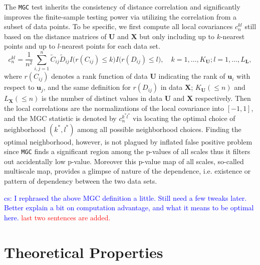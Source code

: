 \documentclass[11pt]{article}
\theoremstyle{definition}
\newcommand{\cs}[1]{\textcolor{blue}{cs: #1}}
\begin{document}
	The \texttt{MGC} test inherits the consistency of distance correlation and significantly improves the finite-sample testing power via utilizing the correlation from a subset of data points. To be specific, we first compute all local covariances $c^{kl}_{n}$ still based on the distance matrices of $\mathbf{U}$ and $\mathbf{X}$ but only including up to $k$-nearest points and up to $l$-nearest points for each data set. 
	\begin{equation}
	\label{eq:MGC}
	c^{kl}_{n} = \frac{1}{n^2} \sum\limits_{i,j=1}^{n} \tilde{C}_{ij} \tilde{D}_{ij} I\big( r(C_{ij}) \leq k \big) I\big(  r(D_{ij}) \leq l  \big), \quad k= 1, \ldots, K_{\mathbf{U}}; l =1, \ldots, L_{\mathbf{L}},
	\end{equation}
	where %
	$r(C_{ij})$ denotes a rank function of data $\mathbf{U}$ indicating the rank of $\mathbf{u}_{i}$ with respect to $\mathbf{u}_{j}$, and the same definition for $r(D_{ij})$ in data $\mathbf{X}$; 
	$K_{\mathbf{U}} (\leq n)$ and $L_{\mathbf{X}} (\leq n)$ is the number of distinct values in data $\mathbf{U}$ and $\mathbf{X}$ respectively. Then the local correlations are the normalizations of the local covariance into $[-1,1]$, and the MGC statistic is denoted by $c^{k^{*} l^{*}}_{n}$ via locating the optimal choice of neighborhood $(k^{*}, l^{*})$ among all possible neighborhood choices. Finding the optimal neighborhood, however, is not plagued by inflated false positive problem since \texttt{MGC} finds a significant region among the p-values of all scales thus it filters out accidentally low p-value. Moreover this p-value map of all scales, so-called multiscale map, provides a glimpse of nature of the dependence, i.e. existence or pattern of dependency between the two data sets. 
	
	\cs{I rephrased the above MGC definition a little. Still need a few tweaks later. Better explain a bit on computation advantage, and what it means to be optimal here. }
	\textcolor{red}{last two sentences are added.}
	
	
	\section{Theoretical Properties}
	\label{sec:theory}
	
\end{document}
